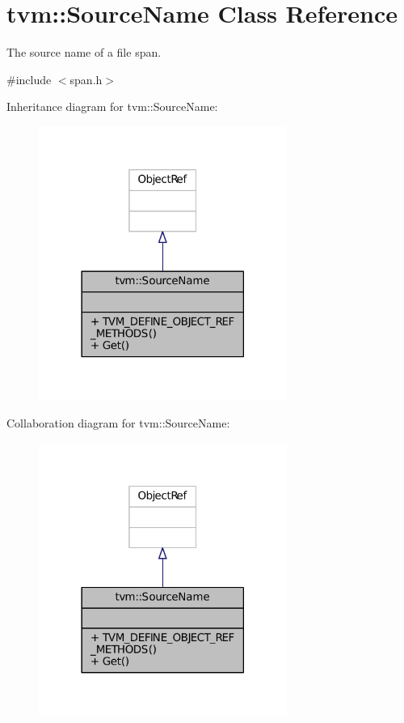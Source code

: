 \hypertarget{classtvm_1_1SourceName}{}\section{tvm\+:\+:Source\+Name Class Reference}
\label{classtvm_1_1SourceName}


The source name of a file span.  




{\ttfamily \#include $<$span.\+h$>$}



Inheritance diagram for tvm\+:\+:Source\+Name\+:
\nopagebreak
\begin{figure}[H]
\begin{center}
\leavevmode
\includegraphics[width=230pt]{classtvm_1_1SourceName__inherit__graph}
\end{center}
\end{figure}


Collaboration diagram for tvm\+:\+:Source\+Name\+:
\nopagebreak
\begin{figure}[H]
\begin{center}
\leavevmode
\includegraphics[width=230pt]{classtvm_1_1SourceName__coll__graph}
\end{center}
\end{figure}
